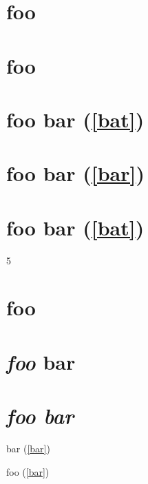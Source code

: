 
\def\mytitle{Advanced Headers}


\part{foo  }
\label{bar}

\part{foo}
\label{bar}

\part{foo bar (\autoref{bat})}
\label{foobarbat}

\part{foo bar (\autoref{bar}) }
\label{bat}

\part{foo bar (\autoref{bat})}
\label{baz}

5

\part{foo }
\label{bar}

\part{\emph{foo} bar }
\label{foobar}

\part{\emph{foo
bar}}
\label{foobar}

bar (\autoref{bar})

foo (\autoref{bar})



